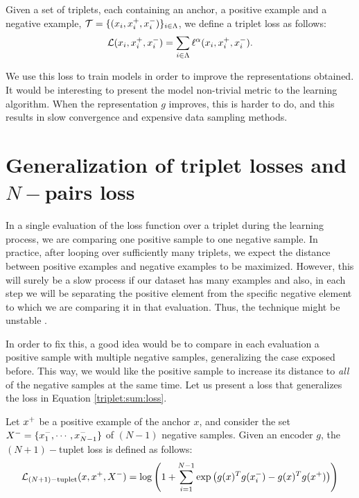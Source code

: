 \begin{ndef}
Given a set of triplets, each containing an anchor, a positive example and a negative example, $\mathcal T = \{(x_i,x^+_i,x^-_i)\}_{i \in \Lambda}$, we define a triplet loss as follows:
\begin{equation}\label{triplet:sum:loss}
\mathcal L (x_i,x^+_i,x^-_i) = \sum_{i \in \Lambda} \ell^\alpha(x_i,x^+_i,x^-_i).
\end{equation}

\end{ndef}



We use this loss to train models in order to improve the representations obtained. It would be interesting to present the model non-trivial metric to the learning algorithm. When the representation $g$ improves, this is harder to do, and this results in slow convergence and expensive data sampling methods.

\section{Generalization of triplet losses and $N-$pairs loss}

In a single evaluation of the loss function over a triplet during the learning process, we are comparing one positive sample to one negative sample. In practice, after looping over sufficiently many triplets, we expect the distance between positive examples and negative examples to be maximized. However, this will surely be a slow process if our dataset has many examples and also, in each step we will be separating the positive element from the specific negative element to which we are comparing it in that evaluation. Thus, the technique might be unstable \citep{Sohn2016ImprovedDM}.

In order to fix this, a good idea would be to compare in each evaluation a positive sample with multiple negative samples, generalizing the case exposed before. This way, we would like the positive sample to increase its distance to \emph{all} of the negative samples at the same time. Let us present a loss that generalizes the loss in Equation \eqref{triplet:sum:loss}.

\begin{ndef}
Let $x^+$ be a positive example of the anchor $x$, and consider the set $X^- = \{x^-_1,\cdots,x^-_{N-1}\}$ of $(N-1)$ negative samples. Given an encoder $g$, the $(N+1)-$tuplet loss is defined as follows:
\begin{equation}\label{nplus1:tuplet:loss}
\mathcal L_{(N+1)-\text{tuplet}}(x,x^+,X^-) = \log \left( 1+ \sum_{i=1}^{N-1} \exp \left(g(x)^T g(x^-_i) - g(x)^T g(x^+)\right)\right) 
\end{equation}
\end{ndef}

